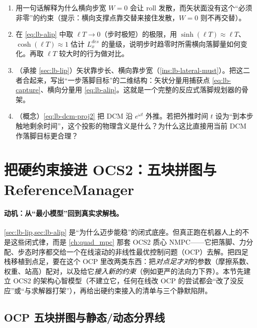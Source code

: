 \begin{practice}
\begin{enumerate}
  \item 用一句话解释为什么横向步宽 $W=0$ 会让 roll 发散，而矢状面没有这个“必须非零”的约束（提示：横向支撑点靠交替来接住发散，$W=0$ 则不再交替）。
  \item 在 \cref{eq:lb-alip} 中取 $\ell T\to 0$（步时极短）的极限，用 $\sinh(\ell T)\approx \ell T$、$\cosh(\ell T)\approx 1$ 估计 $L_x^{des}$ 的量级，说明步时趋零时所需横向落脚量如何变化。再取 $\ell T$ 较大时的行为做对比。
  \item （承接 \cref{sec:lb-lip}）矢状靠步长、横向靠步宽（\cref{ins:lb-lateral-must}）。把这二者合起来，写出“一步落脚目标”的二维结构：矢状分量用捕获点 \cref{eq:lb-capture}、横向分量用 \cref{eq:lb-alip}。这就是一个完整的反应式落脚规划器的骨架。
  \item （概念）\cref{eq:lb-dcm-proj2} 把 DCM 沿 $e^{\omega t}$ 外推。若把外推时间 $t$ 设为“到本步触地剩余时间”，这个投影的物理含义是什么？为什么这比直接用当前 DCM 作落脚目标更合理？
\end{enumerate}
\end{practice}

\section{把硬约束接进 OCS2：五块拼图与 ReferenceManager}
\label{sec:lb-ocs2}

\paragraph{动机：从“最小模型”回到真实求解栈。}
\cref{sec:lb-lip,sec:lb-alip} 是“为什么迈步能稳”的闭式底座。但真正跑在机器人上的不是这些闭式律，而是 \cref{ch:quad_mpc} 那套 OCS2 质心 NMPC——它把落脚、力分配、步态时序都交给一个在线滚动的非线性最优控制问题（OCP）去解。把四足栈移植到点足，要在这个 OCP 里改两类东西：把\emph{对点足才对}的参数（摩擦系数、权重、站高）配对，以及给它\emph{接入新的约束}（例如更严的法向力下界）。本节先建立 OCS2 的架构心智模型（不建立它，任何在线改 OCP 的尝试都会“改了没反应”或“与求解器打架”），再给出硬约束接入的清单与三个静默陷阱。

\subsection{OCP 五块拼图与静态/动态分界线}
\label{subsec:lb-five-pieces}


